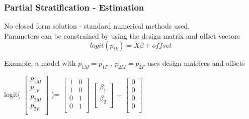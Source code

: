 \documentclass{beamer}
\begin{document}
\begin{frame} \frametitle{Partial Stratification -  Estimation}

No closed form solution - standard numerical methods used. \\[5mm]

Parameters can be constrained by using the design matrix  and offset vectors 
$$ logit(p_{tk}) = X \beta + offset$$

Example, a model with  $p_{1M} = p_{1F}$ ,  $p_{2M} = p_{2F}$
uses design matrices and offsets\\
\begin{center} logit(
$\begin{bmatrix}
p_{1M}\\
p_{1F}\\
p_{2M}\\
p_{2F}\\
\end{bmatrix}$ )=
$\begin{bmatrix}
1 & 0\\
1 & 0\\
0 & 1 \\
0 & 1 \\
 \end{bmatrix}$ 
$\begin{bmatrix}
\beta_{1}\\
\beta_{2}\\
\end{bmatrix}$
 + 
$ \begin{bmatrix}
0\\
0\\
0\\
0\\
\end{bmatrix}$
\end{center}

\end{frame}


\end{document}
